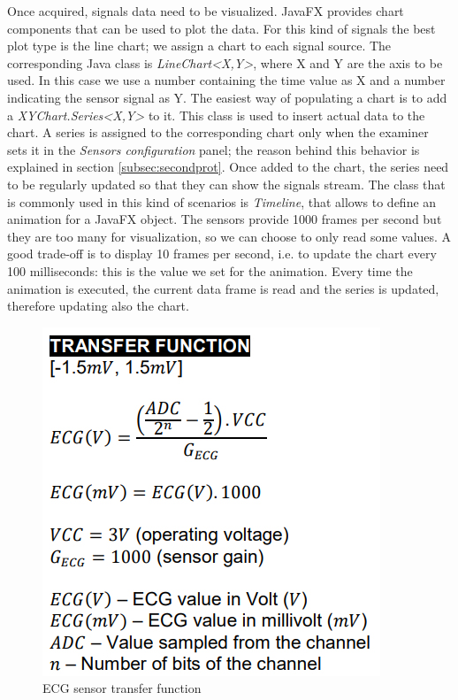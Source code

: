 \documentclass[binding=0.6cm,LaM]{sapthesis}
\begin{document}
Once acquired, signals data need to be visualized. JavaFX provides chart components that can be used to plot the data. For this kind of signals the best plot type is the line chart; we assign a chart to each signal source. The corresponding Java class is \textit{LineChart<X,Y>}, where X and Y are the axis to be used. In this case we use a number containing the time value as X and a number indicating the sensor signal as Y. The easiest way of populating a chart is to add a \textit{XYChart.Series<X,Y>} to it. This class is used to insert actual data to the chart. A series is assigned to the corresponding chart only when the examiner sets it in the \textit{Sensors configuration} panel; the reason behind this behavior is explained in section \ref{subsec:secondprot}. Once added to the chart, the series need to be regularly updated so that they can show the signals stream. The class that is commonly used in this kind of scenarios is \textit{Timeline}, that allows to define an animation for a JavaFX object. The sensors provide 1000 frames per second but they are too many for visualization, so we can choose to only read some values. A good trade-off is to display 10 frames per second, i.e. to update the chart every 100 milliseconds: this is the value we set for the animation. Every time the animation is executed, the current data frame is read and the series is updated, therefore updating also the chart. 

\begin{figure}[h]
\centering
\includegraphics[scale=.4]{images/transfer_function}
\caption{ECG sensor transfer function}
\end{figure}
\end{document}
